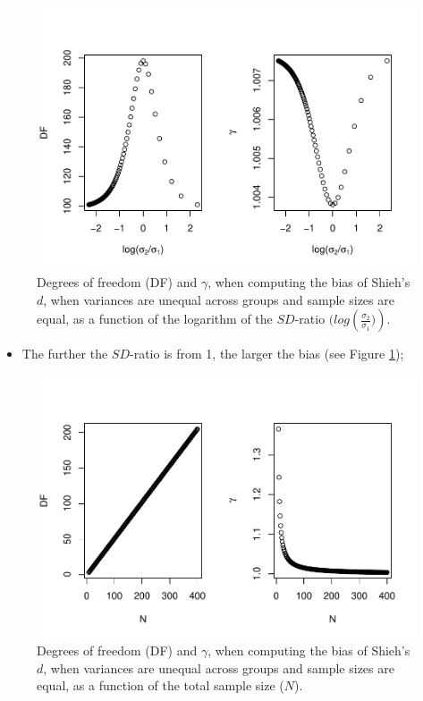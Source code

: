 \documentclass[
  english,
  man,mask]{apa6}
\providecommand{\tightlist}{%
  \setlength{\itemsep}{0pt}\setlength{\parskip}{0pt}}
\begin{document}
\begin{figure}
\centering
\includegraphics{SupMat1_files/figure-latex/biasshiehhetbalSDratio2-1.pdf}
\caption{\label{fig:biasshiehhetbalSDratio2}Degrees of freedom (DF) and \(\gamma\), when computing the bias of Shieh's \(d\), when variances are unequal across groups and sample sizes are equal, as a function of the logarithm of the \(SD\)-ratio \((log \left(\frac{\sigma_2}{\sigma_1})\right)\).}
\end{figure}

\begin{itemize}
\tightlist
\item
  The further the \(SD\)-ratio is from 1, the larger the bias (see Figure \ref{fig:biasshiehhetbalSDratio2});
\end{itemize}

\begin{figure}
\centering
\includegraphics{SupMat1_files/figure-latex/biasshiehhetbalNsize2-1.pdf}
\caption{\label{fig:biasshiehhetbalNsize2}Degrees of freedom (DF) and \(\gamma\), when computing the bias of Shieh's \(d\), when variances are unequal across groups and sample sizes are equal, as a function of the total sample size (\(N\)).}
\end{figure}
\end{document}
